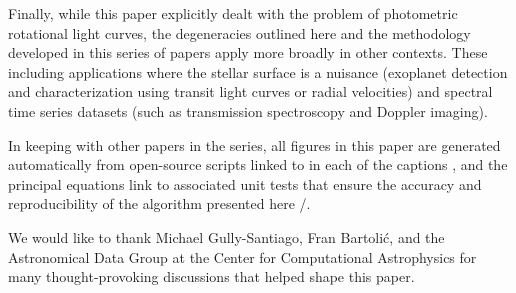 \documentclass[modern]{aastex62}
\begin{document}
Finally, while this paper explicitly dealt with the problem of
photometric rotational light curves, the degeneracies outlined
here and the methodology developed in this series of papers
apply more broadly in other contexts.
These including applications where the stellar
surface is a nuisance (exoplanet detection and characterization using
transit light curves or radial velocities) and spectral time series
datasets (such as transmission spectroscopy and Doppler imaging).


\vspace{2em}

In keeping with other papers in the \starry series, all figures in this
paper are generated automatically from open-source scripts linked to in
each of the captions \codeicon, and the principal equations link to associated
unit tests that ensure the accuracy and reproducibility of the algorithm
presented here \testpassicon/\testfailicon.

%
%
%
%
%
%
%
%

\vspace{2em}

We would like to thank Michael Gully-Santiago, Fran Bartoli\'c, and the
Astronomical Data Group at the Center for Computational Astrophysics for
many thought-provoking discussions that helped shape this paper.



\appendix
\end{document}

